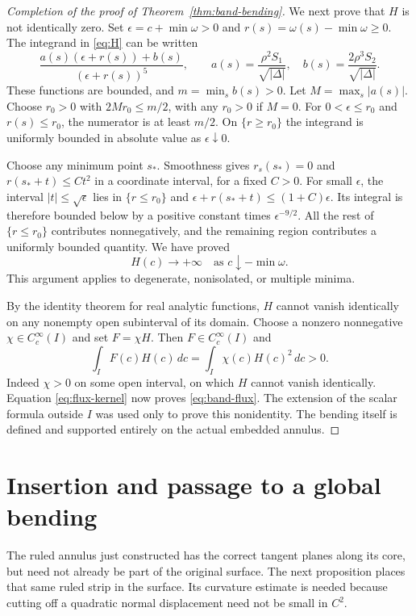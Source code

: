 \documentclass[11pt]{amsart}
\theoremstyle{definition}
\begin{document}
\begin{proof}[Completion of the proof of Theorem~\ref{thm:band-bending}]
We next prove that $H$ is not identically zero.
Set $\epsilon=c+\min\omega>0$ and
$r(s)=\omega(s)-\min\omega\ge0$. The integrand in \eqref{eq:H}
can be written
\[
 \frac{a(s)(\epsilon+r(s))+b(s)}{(\epsilon+r(s))^5},
 \qquad
 a(s)=\frac{\rho^2S_1}{\sqrt{|\Delta|}},\quad
 b(s)=\frac{2\rho^3S_2}{\sqrt{|\Delta|}}.
\]
These functions are bounded, and $m=\min_s b(s)>0$.
Let $M=\max_s|a(s)|$. Choose $r_0>0$ with
$2Mr_0\le m/2$, with any $r_0>0$ if $M=0$.
For $0<\epsilon\le r_0$ and $r(s)\le r_0$, the numerator is at
least $m/2$. On $\{r\ge r_0\}$ the integrand is uniformly bounded
in absolute value as $\epsilon\downarrow0$.

Choose any minimum point $s_*$. Smoothness gives $r_s(s_*)=0$
and $r(s_*+t)\le Ct^2$ in a coordinate interval, for a fixed
$C>0$. For small $\epsilon$, the interval $|t|\le\sqrt\epsilon$
lies in $\{r\le r_0\}$ and
$\epsilon+r(s_*+t)\le(1+C)\epsilon$.
Its integral is therefore bounded below by a positive constant
times $\epsilon^{-9/2}$. All the rest of $\{r\le r_0\}$
contributes nonnegatively, and the remaining region contributes
a uniformly bounded quantity. We have proved
\[
 H(c)\longrightarrow+\infty\quad
                 \text{as }c\downarrow-\min\omega.
\]
This argument applies to degenerate, nonisolated, or multiple minima.

By the identity theorem for real analytic functions, $H$ cannot
vanish identically on any nonempty open subinterval of its domain.
Choose a nonzero nonnegative $\chi\in C_c^\infty(I)$ and set
$F=\chi H$. Then $F\in C_c^\infty(I)$ and
\[
 \int_I F(c)H(c)\,dc=\int_I\chi(c)H(c)^2\,dc>0.
\]
Indeed $\chi>0$ on some open interval, on which $H$ cannot
vanish identically. Equation \eqref{eq:flux-kernel} now proves
\eqref{eq:band-flux}. The extension of the scalar formula outside
$I$ was used only to prove this nonidentity. The bending itself
is defined and supported entirely on the actual embedded annulus.
\end{proof}

\section{Insertion and passage to a global bending}
\label{sec:insertion}

The ruled annulus just constructed has the correct tangent planes
along its core, but need not already be part of the original surface.
The next proposition places that same ruled strip in the surface.
Its curvature estimate is needed because cutting off a quadratic
normal displacement need not be small in $C^2$.
\end{document}
